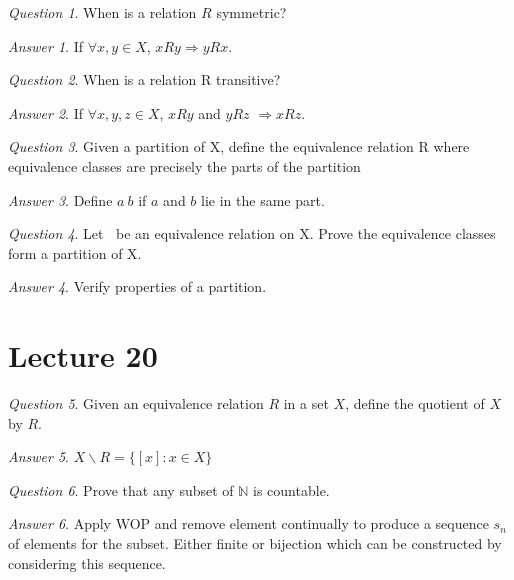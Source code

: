 \documentclass[]{article}
\def\naturals{\mathbb{N}}
\theoremstyle{remark}
\theoremstyle{qnstyle}
\newtheorem{question}{Question}
\theoremstyle{answerstyle}
\newtheorem*{answer}{Answer}
\begin{document}
\begin{question}
    When is a relation $R$ symmetric?
\end{question}
\begin{answer}
    If $\forall x,y \in X$, $xRy \Rightarrow yRx$.
\end{answer}

\begin{question}
    When is a relation R transitive?
\end{question}
\begin{answer}
    If $\forall x,y,z \in X$, $xRy$ and $yRz$ $\Rightarrow xRz$.
\end{answer}

\begin{question}
    Given a partition of X, define the equivalence relation R where equivalence
    classes are precisely the parts of the partition
\end{question}
\begin{answer}
    Define $a ~ b$ if $a$ and $b$ lie in the same part.
\end{answer}

\begin{question}
    Let $~$ be an equivalence relation on X. Prove the equivalence classes
    form a partition of X.
\end{question}
\begin{answer}
    Verify properties of a partition.
\end{answer}





\section* {Lecture 20}

\begin{question}
    Given an equivalence relation $R$ in a set $X$,
    define the quotient of $X$ by $R$.
\end{question}
\begin{answer}
    $X \backslash R = \{[x]: x \in X\}$
\end{answer}

\begin{question}
    Prove that any subset of $\naturals$ is countable.
\end{question}
\begin{answer}
    Apply WOP and remove element continually to produce a sequence $s_n$ of elements
    for the subset. Either finite or bijection which can be constructed by considering
    this sequence.
\end{answer}
\end{document}

